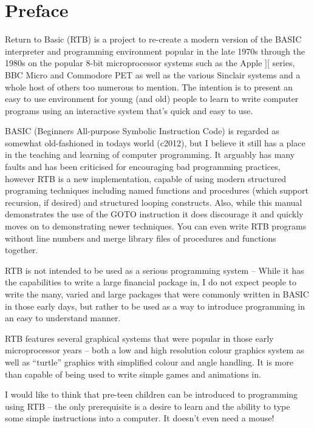 \section*{Preface}

\vspace{3ex}
\noindent
Return to Basic (RTB) is a project to re-create a modern version of
the BASIC interpreter and programming environment popular in the
late 1970s through the 1980s on the popular 8-bit microprocessor
systems such as the Apple ][ series, BBC Micro and Commodore PET
as well as the various Sinclair systems and a whole host of others
too numerous to mention. The intention is to present an easy to use
environment for young (and old) people to learn to write computer
programs using an interactive system that's quick and easy to use.

BASIC (Beginners All-purpose Symbolic Instruction Code) is regarded as
somewhat old-fashioned in todays world (c2012), but I believe it still
has a place in the teaching and learning of computer programming. It
arguably has many faults and has been criticised for encouraging bad
programming practices, however RTB is a new implementation, capable
of using modern structured programing techniques including named
functions and procedures (which support recursion, if desired) and
structured looping constructs. Also, while this manual demonstrates the
use of the GOTO instruction it does discourage it and quickly moves on
to demonstrating newer techniques. You can even write RTB programs without
line numbers and merge library files of procedures and functions together.

RTB is not intended to be used as a serious programming system --
While it has the capabilities to write a large financial package in, I
do not expect people to write the many, varied and large packages that
were commonly written in BASIC in those early days, but rather to be
used as a way to introduce programming in an easy to understand manner.

RTB features several graphical systems that were popular in those early
microprocessor years -- both a low and high resolution colour graphics
system as well as ``turtle'' graphics with simplified colour and angle
handling. It is more than capable of being used to write simple games
and animations in.

I would like to think that pre-teen children can be introduced to
programming using RTB -- the only prerequisite is a desire to learn and
the ability to type some simple instructions into a computer. It doesn't
even need a mouse!

